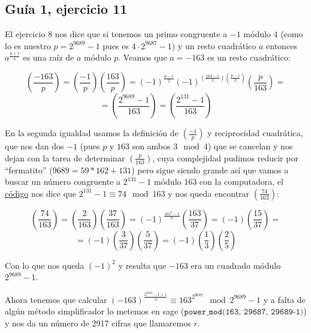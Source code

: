 \documentclass[12pt]{amsart}
\newcommand{\leg}[2]{\left( \frac{#1}{#2} \right)}
\newcommand{\lp}{\left(}
\newcommand{\rp}{\right)}
\theoremstyle{plain}
\begin{document}









\subsection*{Guía 1, ejercicio 11}

El ejercicio 8 nos dice que si tenemos un primo congruente a 
$-1$ módulo $4$ (como lo es nuestro $p=2^{9689}-1$ pues es 
$4\cdot 2^{9687} -1$) y un resto cuadrático $a$ entonces 
$a^{\frac{p+1}{4}}$ es una raíz de $a$ módulo $p$. Veamos que 
$a = -163$ es un resto cuadrático:

$$\leg{-163}{p} =\leg{-1}{p}\leg{163}{p} = (-1)^{\frac{p-1}{2}}
(-1)^{\lp\frac{163-1}{2}\rp\lp\frac{p-1}{2}\rp} \leg{p}{163} =$$
$$= \leg{2^{9689}-1}{163}=\leg{2^{131}-1}{163}$$

En la segunda igualdad usamos la definición de $\leg{-1}{p}$ y 
reciprocidad cuadrática, que nos dan dos $-1$ (pues $p$ y $163$ 
son ambos $3\mod{4}$) que se cancelan y nos dejan con la tarea 
de determinar $\leg{p}{163}$, cuya complejidad pudimos reducir 
por ``fermatito'' ($9689 = 59*162 + 131$) pero sigue siendo 
grande así que vamos a buscar un número congruente a $2^{131}-1$ 
módulo $163$ con la computadora, el \hyperref[codigo1]{código} 
nos dice que $2^{131}-1\equiv 74 \mod{163}$ y nos queda 
encontrar $\leg{74}{163}$:

$$\leg{74}{163} = \leg{2}{163}\leg{37}{163} = (-1)^{\frac{163^2-1}{8}}
\leg{163}{37}= (-1) \leg{15}{37} =$$
$$= (-1)\leg{3}{37}\leg{5}{37} = (-1)\leg{1}{3}\leg{2}{5}$$

Con lo que nos queda $(-1)^2$ y resulta que $-163$ era un 
cuadrado módulo $2^{9689}-1$. 

Ahora tenemos que calcular $(-163)^{\frac{2^{9689}-1+1}{4}} 
\equiv 163^{2^{9687}} \mod{2^{9689}-1}$ y a falta de algún 
método simplificador lo metemos en sage 
($\texttt{power\_mod(163, 2\^{}9687, 2\^{}9689-1)}$) y nos
da un número de 2917 cifras que llamaremos $r$.
\end{document}
